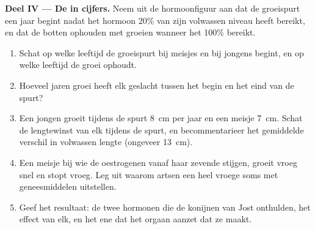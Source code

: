 \begin{problem}
\medskip
\noindent\textbf{Deel IV --- De  in cijfers.}
Neem uit de hormoonfiguur aan dat de groeispurt een jaar begint nadat het
hormoon 20\% van zijn volwassen niveau heeft bereikt, en dat de botten
ophouden met groeien wanneer het 100\% bereikt.
\begin{enumerate}[resume]
  \item Schat op welke leeftijd de groeispurt bij meisjes en bij jongens
        begint, en op welke leeftijd de groei ophoudt.
  \item Hoeveel jaren groei heeft elk geslacht tussen het begin en het
        eind van de spurt?
  \item Een jongen groeit tijdens de spurt \qty{8}{cm} per jaar en een
        meisje \qty{7}{cm}. Schat de lengtewinst van elk tijdens de
        spurt, en becommentarieer het gemiddelde verschil in
        volwassen lengte (ongeveer \qty{13}{cm}).
  \item Een meisje bij wie de oestrogenen vanaf haar zevende stijgen,
        groeit vroeg snel en stopt vroeg. Leg uit waarom artsen een heel
        vroege  soms met geneesmiddelen uitstellen.
  \item Geef het resultaat: de twee hormonen die de konijnen van Jost
        onthulden, het effect van elk, en het ene  dat het orgaan
        aanzet dat ze maakt.
\end{enumerate}
\end{problem}
